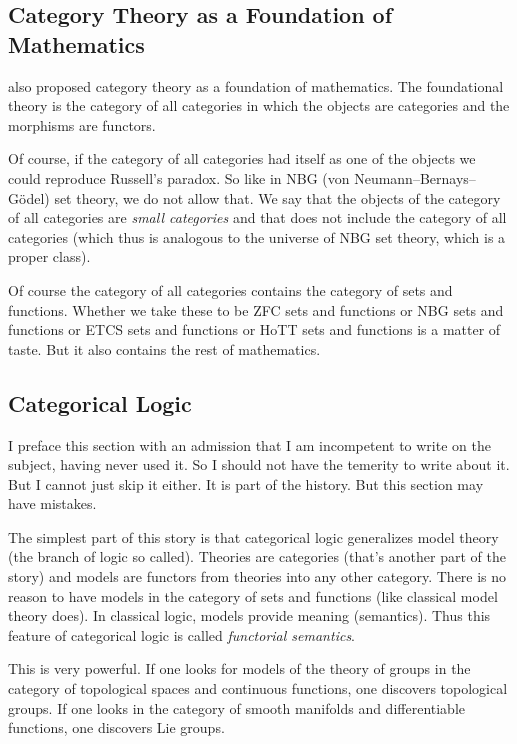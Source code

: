 \documentclass[11pt]{article}
\begin{document}
\subsection{Category Theory as a Foundation of Mathematics}

\citet{lawvere-thesis,lawvere-cat-of-cat}
also proposed category theory as a foundation of mathematics.
The foundational theory is the category of all categories
in which the objects are categories and the morphisms are functors.

Of course, if the category of all categories had itself as one of the objects
we could reproduce Russell's paradox.
So like in NBG (von Neumann--Bernays--G\"{o}del) set theory, we do not allow
that.  We say that the objects of the category of all categories are
\emph{small categories} and that does not include the category of all
categories (which thus is analogous to the universe of NBG set theory,
which is a proper class).

Of course the category of all categories contains the category of sets and
functions.  Whether we take these to be ZFC sets and functions or NBG sets
and functions or ETCS sets and functions or HoTT sets and functions
 is a matter of taste.
But it also contains the rest of mathematics.

\subsection{Categorical Logic}
\label{sec:categorical-logic}

I preface this section with an admission that I am incompetent to write
on the subject, having never used it.  So I should not have the temerity
to write about it.  But I cannot just skip it either.  It is part of the
history.  But this section may have mistakes.

The simplest part of this story is that categorical logic generalizes
model theory (the branch of logic so called).  Theories are categories
(that's another part of the story) and models are functors from theories
into any other category.  There is no reason to have models in the category
of sets and functions (like classical model theory does).
In classical logic, models provide meaning (semantics).
Thus this feature of categorical logic is called \emph{functorial semantics}.

This is very powerful.  If one looks for models of the theory of groups in
the category of topological spaces and continuous functions, one discovers
topological groups.  If one looks in the category of smooth manifolds
and differentiable functions, one discovers Lie groups.
\end{document}
